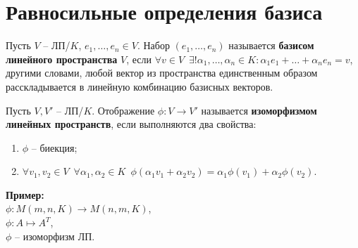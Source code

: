 
\section{Равносильные определения базиса}

\begin{conj}
    Пусть $V$ -- ЛП/$K$, $e_1, \dots, e_n \in V$.
    Набор $(e_1, \dots, e_n)$ называется \textbf{базисом линейного 
    пространства} $V$, если $\forall v \in V \,\,\, \exists! \alpha_1,
    \dots, \alpha_n \in K : \alpha_1 e_1 + \dots + \alpha_n e_n = v$,
    другими словами, любой вектор из пространства единственным образом
    расскладывается в линейную комбинацию базисных векторов.
\end{conj}

\begin{conj}
    Пусть $V, V'$ -- ЛП/$K$. Отображение $\phi : V \to V'$
    называется \textbf{изоморфизмом линейных пространств}, если
    выполняются два свойства:
    \begin{enumerate}
        \item $\phi$ -- биекция;
        \item $\forall v_1, v_2 \in V \,\,\, \forall \alpha_1, \alpha_2
        \in K \,\,\, \phi(\alpha_1 v_1 + \alpha_2 v_2) = \alpha_1
        \phi (v_1) + \alpha_2 \phi(v_2)$.
    \end{enumerate}
\end{conj}

$ $\\
\textbf{Пример:}\\
$\phi : M(m, n, K) \to M(n, m, K)$,\\
$\phi : A \mapsto A^T$, \\
$\phi$ -- изоморфизм ЛП.

